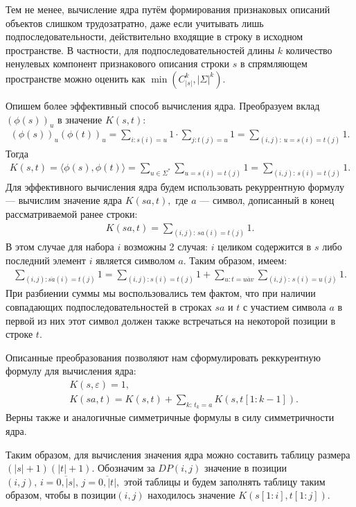 \documentclass[12pt,fleqn]{article}
\begin{document}
	\par Тем не менее, вычисление ядра путём формирования признаковых описаний объектов слишком трудозатратно, даже если учитывать лишь подпоследовательности, действительно входящие в строку в исходном пространстве. В частности, для подпоследовательностей длины $k$ количество ненулевых компонент признакового описания строки $s$ в спрямляющем пространстве можно оценить как $\min \left(C_{|s|}^k , |\Sigma|^k \right).$
	\par Опишем более эффективный способ вычисления ядра. Преобразуем вклад $(\phi(s))_u$ в значение $K(s, t)$:
	\begin{align*}
		(\phi(s))_u (\phi(t))_u = 
		\sum_{i: s(i) = u} 1 \cdot \sum_{j: t(j) = u} 1 =
		\sum_{(i, j): \, u = s(i) =  t(j)} 1.
	\end{align*}
	Тогда
	\begin{align*}
		K(s, t) = 
		\langle \phi(s), \phi(t) \rangle =
		\sum_{u \in \Sigma^*} \sum_{u = s(i) = t(j)} 1 =
		\sum_{(i, j): \, s(i) =  t(j)} 1.
	\end{align*}
	Для эффективного вычисления ядра будем использовать рекуррентную формулу — вычислим значение ядра $K(sa, t),$ где $a$ — символ, дописанный в конец рассматриваемой ранее строки:
	\begin{align*}
		K(sa, t) =  \sum_{(i, j): \, sa(i) =  t(j)} 1.
	\end{align*}
	В этом случае для набора $i$ возможны 2 случая: $i$ целиком содержится в $s$ либо последний элемент $i$ является символом $a$. Таким образом, имеем:
	\begin{align*}
		\sum_{(i, j): \overline{sa}(i) =  t(j)} 1 = \sum_{(i, j): s(i) =  t(j)} 1 + \sum_{u: t = \overline{uav}} \sum_{(i, j): \, s(i) =  u(j)} 1.
	\end{align*}	 
	При разбиении суммы мы воспользовались тем фактом, что при наличии совпадающих подпоследовательностей в строках $sa$ и $t$ с участием символа $a$ в первой из них этот символ должен также встречаться на некоторой позиции в строке $t$.
	\par Описанные преобразования позволяют нам сформулировать реккурентную формулу для вычисления ядра:
	\begin{align*}
		&K(s, \varepsilon) = 1,\\
		&K(sa, t) = K(s, t) + \sum_{k: \, t_k = a} K(s, t[1:k-1]).
	\end{align*}
	Верны также и аналогичные симметричные формулы в силу симметричности ядра.
	\par Таким образом, для вычисления значения ядра можно составить таблицу размера $(|s| + 1) (|t| + 1).$ Обозначим за $DP(i, j)$ значение в позиции $(i, j), \, i = \overline{0, |s|}, \, j = \overline{0, |t|},$ этой таблицы и будем заполнять таблицу таким образом, чтобы в позиции$(i, j)$ находилось значение $K(s[1:i], t[1:j]).$ 
	
\end{document}
